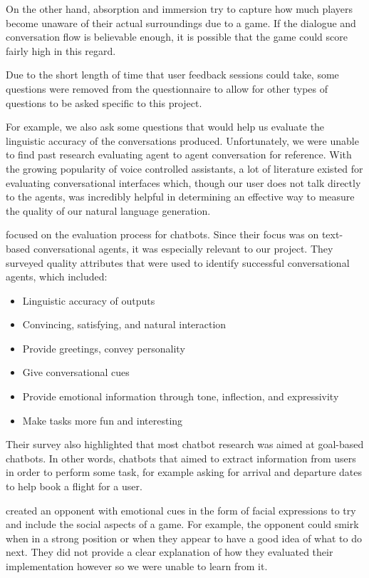 \documentclass{article}
\begin{document}
On the other hand, absorption and immersion try to capture how much players become unaware of their actual surroundings due to a game. If the dialogue and conversation flow is believable enough, it is possible that the game could score fairly high in this regard.

Due to the short length of time that user feedback sessions could take, some questions were removed from the questionnaire to allow for other types of questions to be asked specific to this project.

For example, we also ask some questions that would help us evaluate the linguistic accuracy of the conversations produced. Unfortunately, we were unable to find past research evaluating agent to agent conversation for reference. With the growing popularity of voice controlled assistants, a lot of literature existed for evaluating conversational interfaces which, though our user does not talk directly to the agents, was incredibly helpful in determining an effective way to measure the quality of our natural language generation. 

\cite{conveval} focused on the evaluation process for chatbots. Since their focus was on text-based conversational agents, it was especially relevant to our project. They surveyed quality attributes that were used to identify successful conversational agents, which included:
\begin{itemize}
	\item Linguistic accuracy of outputs
	\item Convincing, satisfying, and natural interaction
	\item Provide greetings, convey personality
	\item Give conversational cues
	\item Provide emotional information through tone, inflection, and expressivity
	\item Make tasks more fun and interesting
\end{itemize} 

Their survey also highlighted that most chatbot research was aimed at goal-based chatbots. In other words, chatbots that aimed to extract information from users in order to perform some task, for example asking for arrival and departure dates to help book a flight for a user. 

\cite{pervchess} created an opponent with emotional cues in the form of facial expressions to try and include the social aspects of a game. For example, the opponent could smirk when in a strong position or when they appear to have a good idea of what to do next. They did not provide a clear explanation of how they evaluated their implementation however so we were unable to learn from it. 
\end{document}
